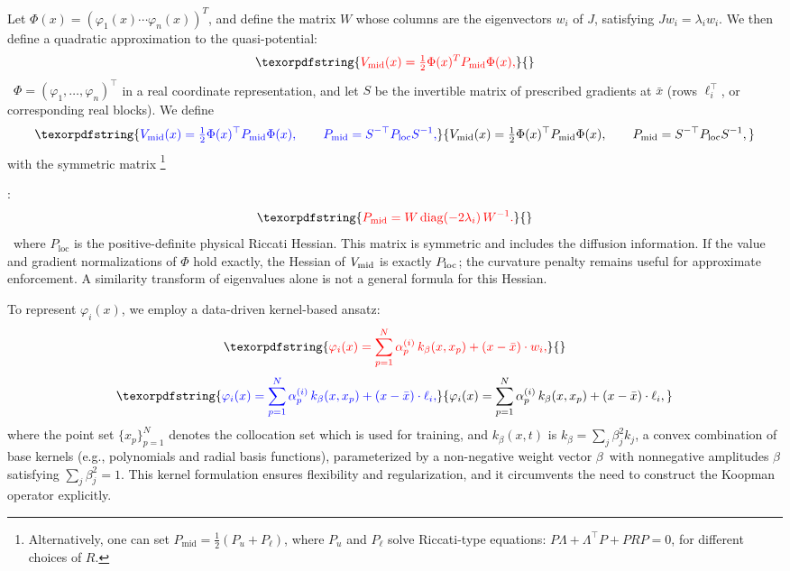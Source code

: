 \documentclass[11pt]{article}
\theoremstyle{plain}      %
\theoremstyle{definition} %
\providecommand{\DIFaddtex}[1]{{\protect\color{blue}#1}} %
\providecommand{\DIFdeltex}[1]{{\protect\color{red}#1}} %
\providecommand{\DIFaddbegin}{} %
\providecommand{\DIFaddend}{} %
\providecommand{\DIFdelbegin}{} %
\providecommand{\DIFdelend}{} %
\providecommand{\DIFadd}[1]{\texorpdfstring{\DIFaddtex{#1}}{#1}} %
\providecommand{\DIFdel}[1]{\texorpdfstring{\DIFdeltex{#1}}{}} %
\newcommand{\DIFscaledelfig}{1.0}
\newlength{\DIFdelgraphicswidth} %
\newlength{\DIFdelgraphicsheight} %
\newcommand{\DIFaddincludegraphics}[2][]{{\color{blue}\fbox{\DIFOincludegraphics[#1]{#2}}}} %
\newcommand{\DIFdelincludegraphics}[2][]{%
\sbox{\DIFdelgraphicsbox}{\DIFOincludegraphics[#1]{#2}}%
\settoboxwidth{\DIFdelgraphicswidth}{\DIFdelgraphicsbox} %
\settoboxtotalheight{\DIFdelgraphicsheight}{\DIFdelgraphicsbox} %
\scalebox{\DIFscaledelfig}{%
\parbox[b]{\DIFdelgraphicswidth}{\usebox{\DIFdelgraphicsbox}\\[-\baselineskip] \rule{\DIFdelgraphicswidth}{0em}}\llap{\resizebox{\DIFdelgraphicswidth}{\DIFdelgraphicsheight}{%
\setlength{\unitlength}{\DIFdelgraphicswidth}%
\begin{picture}(1,1)%
\thicklines\linethickness{2pt} %
{\color[rgb]{1,0,0}\put(0,0){\framebox(1,1){}}}%
{\color[rgb]{1,0,0}\put(0,0){\line( 1,1){1}}}%
{\color[rgb]{1,0,0}\put(0,1){\line(1,-1){1}}}%
\end{picture}%
}\hspace*{3pt}}} %
} %
\DeclareRobustCommand{\DIFaddbegin}{\DIFOaddbegin \let\includegraphics\DIFaddincludegraphics} %
\DeclareRobustCommand{\DIFaddend}{\DIFOaddend \let\includegraphics\DIFOincludegraphics} %
\DeclareRobustCommand{\DIFdelbegin}{\DIFOdelbegin \let\includegraphics\DIFdelincludegraphics} %
\DeclareRobustCommand{\DIFdelend}{\DIFOaddend \let\includegraphics\DIFOincludegraphics} %
\begin{document}
Let \DIFdelbegin \DIFdel{\( \Phi(x) = (\varphi_1(x) \cdots \varphi_n(x))^T \), and define the matrix \( W \) whose columns are the eigenvectors \( w_i \) of \( J \), satisfying \( J w_i = \lambda_i w_i \). We then define
a quadratic approximation to the quasi-potential:
}\begin{displaymath} \DIFdel{%
V_{\text{mid}}(x) = \tfrac{1}{2} \Phi(x)^T P_{\text{mid}} \Phi(x),
}\end{displaymath}%
\DIFdelend\ \DIFaddbegin \DIFadd{$\Phi=(\varphi_1,\ldots,\varphi_n)^\top$ in a real coordinate representation, and let $S$ be the invertible matrix of prescribed gradients at $\bar x$ (rows $\ell_i^\top$, or corresponding real blocks). We define
}\begin{equation}\DIFadd{\label{eq:vmid}
 V_{\mathrm{mid}}(x)=\tfrac12\Phi(x)^\top P_{\mathrm{mid}}\Phi(x),
 \qquad P_{\mathrm{mid}}=S^{-\top}P_{\mathrm{loc}}S^{-1},
}\end{equation}\DIFaddend 
\DIFdelbegin \DIFdel{with the symmetric matrix }\footnote{\DIFdel{Alternatively, one can set \( P_{\text{mid}} = \frac{1}{2}(P_u + P_\ell) \), where \( P_u \) and \( P_\ell \) solve Riccati-type equations: \( P \Lambda + \Lambda^\top P + PRP = 0 \), for different choices of \( R \).}}%
\addtocounter{footnote}{-1}%
\DIFdel{:
}\begin{displaymath}
\DIFdel{P_{\text{mid}} = W\,\mathrm{diag}(-2\lambda_i)\,W^{-1}.
}\end{displaymath}%
\DIFdelend\ \DIFaddbegin \DIFadd{where $P_{\mathrm{loc}}$ is the positive-definite physical Riccati Hessian. This matrix is symmetric and includes the diffusion information. If the value and gradient normalizations of $\Phi$ hold exactly, the Hessian of $V_{\rm mid}$ is exactly $P_{\rm loc}$; the curvature penalty remains useful for approximate enforcement. A similarity transform of eigenvalues alone is not a general formula for this Hessian.
}\DIFaddend 

To represent \( \varphi_i(x) \), we employ a data-driven kernel-based ansatz:
\DIFdelbegin \begin{displaymath}\DIFdel{%
\varphi_i(x) = \sum_{p=1}^N \alpha_p^{(i)}\,k_\beta(x, x_p) + (x - \bar{x}) \cdot w_i,
}\end{displaymath}%
\DIFdelend \DIFaddbegin \begin{equation}\DIFadd{\label{phiix}
\varphi_i(x) = \sum_{p=1}^N \alpha_p^{(i)}\,k_\beta(x, x_p) + (x - \bar{x}) \cdot \ell_i,
}\end{equation}\DIFaddend 
where the point set \( \{ x_p \}_{p=1}^N \) denotes the collocation set which is used for training, and \( k_\beta(x, t) \) is \DIFaddbegin \DIFadd{$k_\beta=\sum_j\beta_j^2k_j$, }\DIFaddend a convex combination of base kernels \DIFdelbegin \DIFdel{(e.g., polynomials and radial basis functions), parameterized by a non-negative weight vector \( \beta \)}\DIFdelend\ \DIFaddbegin \DIFadd{with nonnegative amplitudes $\beta$ satisfying $\sum_j\beta_j^2=1$}\DIFaddend . This kernel formulation ensures flexibility and regularization, and it circumvents the need to construct the Koopman operator explicitly.
\end{document}

